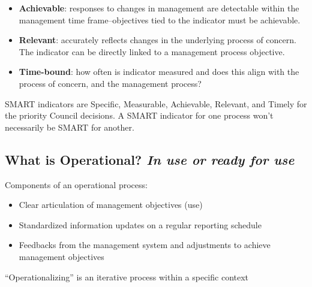 \documentclass[
]{article}
\providecommand{\tightlist}{%
  \setlength{\itemsep}{0pt}\setlength{\parskip}{0pt}}
\begin{document}
\begin{noteblock}

\begin{itemize}
\tightlist
\item
  \textbf{Achievable}: responses to changes in management are detectable
  within the management time frame--objectives tied to the indicator
  must be achievable.
\end{itemize}

\end{noteblock}

\begin{noteblock}

\begin{itemize}
\tightlist
\item
  \textbf{Relevant}: accurately reflects changes in the underlying
  process of concern. The indicator can be directly linked to a
  management process objective.
\end{itemize}

\end{noteblock}

\begin{noteblock}

\begin{itemize}
\tightlist
\item
  \textbf{Time-bound}: how often is indicator measured and does this
  align with the process of concern, and the management process?
\end{itemize}

\end{noteblock}

SMART indicators are Specific, Measurable, Achievable, Relevant, and
Timely for the priority Council decisions. A SMART indicator for one
process won't necessarily be SMART for another.

\begin{ltgreenbox}

\subsection{\texorpdfstring{What is Operational? \emph{In use or ready
for
use}}{What is Operational? In use or ready for use}}\label{what-is-operational-in-use-or-ready-for-use}

Components of an operational process:

\begin{itemize}
\item
  Clear articulation of management objectives (use)
\item
  Standardized information updates on a regular reporting schedule
\item
  Feedbacks from the management system and adjustments to achieve
  management objectives
\end{itemize}

``Operationalizing'' is an iterative process within a specific context

\end{ltgreenbox}
\end{document}
